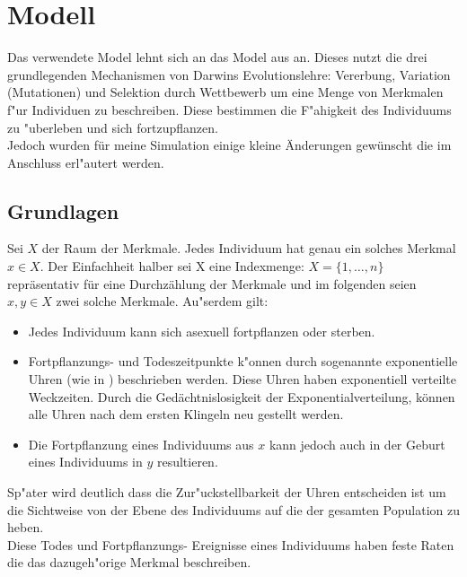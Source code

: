 \documentclass[11pt, a4paper, german]{article}
\begin{document}

\section{Modell}
Das verwendete Model lehnt sich an das Model aus \cite{Champagnat20061127} an. Dieses nutzt die drei grundlegenden Mechanismen von Darwins Evolutionslehre: Vererbung, Variation (Mutationen) und Selektion durch Wettbewerb um eine Menge von Merkmalen f"ur Individuen zu beschreiben. Diese bestimmen die F"ahigkeit des Individuums zu "uberleben und sich fortzupflanzen.\\
Jedoch wurden für meine Simulation einige kleine Änderungen gewünscht die im Anschluss erl"autert werden. \\
	\subsection{Grundlagen}
	Sei $ X $ der Raum der Merkmale. Jedes Individuum hat genau ein solches Merkmal $ x \in X $. Der Einfachheit halber sei X eine Indexmenge: $ X = \{1,\dots, n\} $ repräsentativ für eine Durchzählung der Merkmale und im folgenden seien $ x,y \in X $ zwei solche Merkmale. Au"serdem gilt:
	\begin{itemize}
		\item Jedes Individuum kann sich asexuell fortpflanzen oder sterben.
		\item Fortpflanzungs- und Todeszeitpunkte k"onnen durch sogenannte exponentielle Uhren (wie in \cite[S. 3]{fournier2004microscopic}) beschrieben werden. Diese Uhren haben exponentiell verteilte Weckzeiten. Durch die Gedächtnislosigkeit der Exponentialverteilung, können alle Uhren nach dem ersten Klingeln neu gestellt werden. 
		\item Die Fortpflanzung eines Individuums aus $ x $ kann jedoch auch in der Geburt eines Individuums in $ y $ resultieren.
	\end{itemize}
	Sp"ater wird deutlich dass die Zur"uckstellbarkeit der Uhren entscheiden ist um die Sichtweise von der Ebene des Individuums auf die der gesamten Population zu heben.\\
	Diese Todes und Fortpflanzungs- Ereignisse eines Individuums haben feste Raten die das dazugeh"orige Merkmal beschreiben.\\
	
\end{document}
